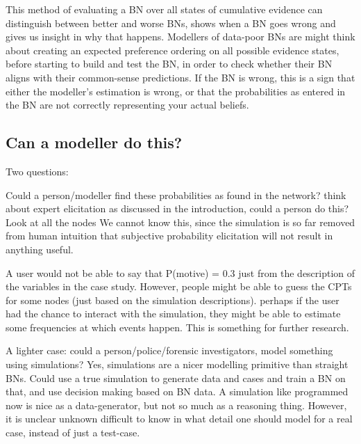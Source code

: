 \documentclass[12pt]{article}
\begin{document}
This method of evaluating a BN over all states of cumulative evidence can distinguish between better and worse BNs, shows when a BN goes wrong and gives us insight in why that happens. Modellers of data-poor BNs are might think about creating an expected preference ordering on all possible evidence states, before starting to build and test the BN, in order to check whether their BN aligns with their common-sense predictions. If the BN is wrong, this is a sign that either the modeller's estimation is wrong, or that the probabilities as entered in the BN are not correctly representing your actual beliefs.


\subsection{Can a modeller do this?}
Two questions:

Could a person/modeller find these probabilities as found in the network?
think about expert elicitation as discussed in the introduction, could a person do this?
Look at all the nodes
We cannot know this, since the simulation is so far removed from human intuition that subjective probability elicitation will not result in anything useful. 



A user would not be able to say that P(motive) = 0.3 just from the description of the variables in the case study. However, people might be able to guess the CPTs for some nodes (just based on the simulation descriptions). perhaps if the user had the chance to interact with the simulation, they might be able to estimate some frequencies at which events happen. This is something for further research. 

A lighter case: could a person/police/forensic investigators, model something using simulations?
Yes, simulations are a nicer modelling primitive than straight BNs. Could use a true simulation to generate data and cases and train a BN on that, and use decision making based on BN data. A simulation like programmed now is nice as a data-generator, but not so much as a reasoning thing. However, it is unclear unknown difficult to know in what detail one should model for a real case, instead of just a test-case.
\end{document}
